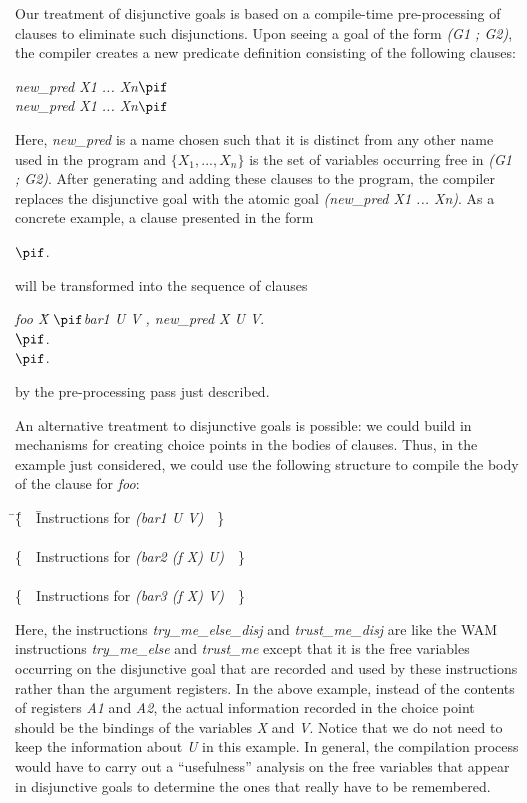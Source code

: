 Our treatment of disjunctive goals is based on a compile-time
pre-processing of clauses to eliminate such disjunctions. Upon seeing
a goal of the form {\it (G1 ; G2)}, the compiler creates a new
predicate definition consisting of the following clauses:
\begin{tabbing}
\dquad\dquad\=
{\it new\_pred  X1 ... Xn}\quad $\pif$\\
\>
{\it new\_pred  X1 ... Xn}\quad $\pif$
\end{tabbing}
Here, {\it new\_pred} is a name chosen such that it is distinct from
any other name used in the program and $\{X_1, ..., X_n\}$ is the
set of variables occurring free in {\it (G1 ; G2)}. After generating
and adding these clauses to the program, the compiler replaces the
disjunctive goal with the atomic goal {\it (new\_pred X1 ... Xn)}.
As a concrete example, a clause presented in the form
\begin{tabbing}
\dquad{}\quad $\pif$.
\end{tabbing}
will be transformed into the sequence of clauses
\begin{tabbing}
\dquad\dquad\={\it foo X}\dquad\dquad\dquad\= $\pif$\quad\= {\it bar1 U V , new\_pred X U V}.\\
\>$\pif$. \\
\>$\pif$.
\end{tabbing}
by the pre-processing pass just described.

An alternative treatment to disjunctive goals is possible: we could
build in mechanisms for creating choice points in the bodies of
clauses. Thus, in the example just considered, we could use the
following structure to compile the body of the clause for {\it foo}:
\begin{tabbing}
\dquad\=\dquad\= \{\ \ \= Instructions for {\it (bar1 U V)}\ \ \}\\
      \>       \> \\
      \>       \>\{\ \ Instructions for {\it (bar2 (f X) U)}\ \ \} \\
      \> \\
      \>       \>\{\ \ Instructions for {\it (bar3 (f X) V)}\ \ \}
\end{tabbing}
Here, the instructions {\it try\_me\_else\_disj} and {\it
  trust\_me\_disj} are like the WAM instructions {\it try\_me\_else}
and {\it trust\_me} except that it is the free variables occurring on
the disjunctive goal that are recorded and used by these instructions
rather than the argument registers. In the above example, instead of
the contents of registers
{\it A1} and {\it A2}, the actual information
recorded in the choice point should be the bindings of the variables
{\it X} and {\it V}.
Notice that we do not need to keep the information about {\it U} in
this example. In general, the compilation process would have to carry
out a ``usefulness'' analysis on the free variables that appear in
disjunctive goals to determine the ones that really have to be
remembered.


